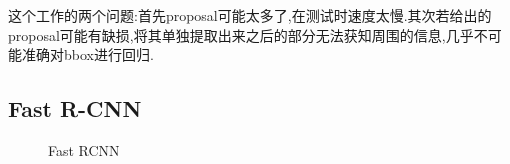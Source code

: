 	这个工作的两个问题:首先proposal可能太多了,在测试时速度太慢.其次若给出的proposal可能有缺损,将其单独提取出来之后的部分无法获知周围的信息,几乎不可能准确对bbox进行回归.
	
	\subsection{Fast R-CNN}
	
	
	\begin{figure}[htbp]
		\centering
		\caption{Fast RCNN}
	\end{figure}
	
